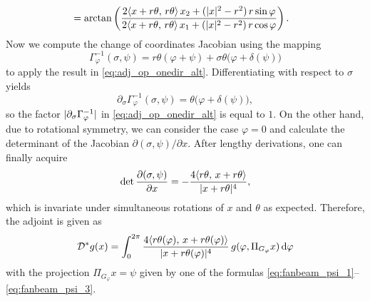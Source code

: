 \documentclass{amsart}
\renewcommand*{\phi}{\varphi}
\begin{document}
\begin{example}
\begin{align}
  \label{eq:fanbeam_psi_3}
  &= \arctan\left(\frac{2 \INNER{x + r\theta}{r\theta}\, x_2 + (\ABS{x}^2 - r^2)\, r\sin\phi}{
  2 \INNER{x + r\theta}{r\theta}\, x_1 + (\ABS{x}^2 - r^2)\, r\cos\phi} \right).
 \end{align}
 Now we compute the change of coordinates Jacobian using the mapping
 \begin{equation*}
  \Gamma_\phi^{-1}(\sigma,\psi) = r \theta(\phi + \psi) + \sigma \theta\big(\phi + \delta(\psi)\big)
 \end{equation*}
 to apply the result in \eqref{eq:adj_op_onedir_alt}. Differentiating with respect to $\sigma$ yields
 \begin{equation*}
  \partial_\sigma \Gamma_\phi^{-1}(\sigma,\psi) = \theta\big(\phi + \delta(\psi)\big),
 \end{equation*}
 so the factor $\ABS{\partial_\sigma\Gamma_\phi^{-1}}$ in \eqref{eq:adj_op_onedir_alt} is equal to $1$. On the other hand, due to 
 rotational symmetry, we can consider the case $\phi=0$ and calculate the determinant of the Jacobian $\partial(\sigma,\psi)/\partial x$. 
 After lengthy derivations, one can finally acquire
 \begin{equation*}
  \operatorname*{det} \frac{\partial(\sigma,\psi)}{\partial x} = - \frac{4 \langle r\theta,\,x+r\theta\rangle}{|x+r\theta|^4},
 \end{equation*}
 which is invariate under simultaneous rotations of $x$ and $\theta$ as expected. Therefore, the adjoint is given as
 \begin{equation}
  \OPD^* g(x) = \int_0^{2\pi} \frac{4 \INNER{r\theta(\phi)}{x+r\theta(\phi)}}{\ABS{x+r\theta(\phi)}^4}\, g(\phi, \Pi_{G_\phi}x) \, \D \phi
 \end{equation} 
 with the projection $\Pi_{G_\phi}x = \psi$ given by one of the formulas \eqref{eq:fanbeam_psi_1}--\eqref{eq:fanbeam_psi_3}.

\end{example}
\end{document}
